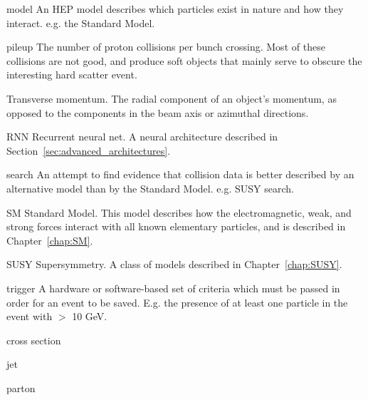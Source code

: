 \begin{symbollist*}
\item[model] An HEP model describes which particles exist in nature and how they interact. e.g. the Standard Model.
\item[pileup] The number of proton collisions per bunch crossing. Most of these collisions are not good, and produce soft objects that mainly serve to obscure the interesting hard scatter event.
\item[\pt] Transverse momentum. The radial component of an object's momentum, as opposed to the components in the beam axis or azimuthal directions.
\item[RNN] Recurrent neural net. A neural architecture described in Section~\ref{sec:advanced_architectures}.
\item[search] An attempt to find evidence that collision data is better described by an alternative model than by the Standard Model. e.g. SUSY search.
\item[SM] Standard Model. This model describes how the electromagnetic, weak, and strong forces interact with all known elementary particles, and is described in Chapter~\ref{chap:SM}.
\item[SUSY] Supersymmetry. A class of models described in Chapter~\ref{chap:SUSY}.
\item[trigger] A hardware or software-based set of criteria which must be passed in order for an event to be saved. E.g. the presence of at least one particle in the event with \pt $>$ 10 GeV.

\item[cross section]
\item[jet]
\item[parton]

\end{symbollist*}